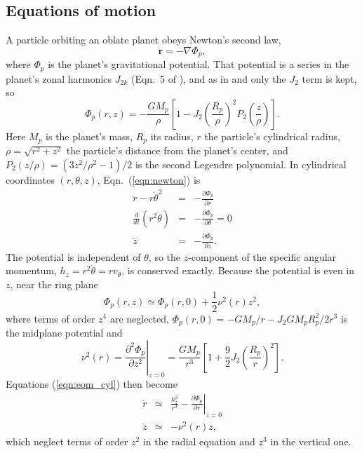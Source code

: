 \documentclass[twocolumn]{aastex702}
\begin{document}
\subsection{Equations of motion}
\label{sec:eom}

A particle orbiting an oblate planet obeys Newton's second law,
\begin{equation}
    \label{eqn:newton}
    \ddot{\mathbf{r}} = -\nabla\Phi_p,
\end{equation}
where $\Phi_p$ is the planet's gravitational potential. That potential is a series in the
planet's zonal harmonics $J_{2k}$ (Eqn.\ 5 of \citealt{BL94}), and as in \cite{HS13} and
\cite{H25} only the $J_2$ term is kept, so
\begin{equation}
    \label{eqn:Phi3d}
    \Phi_p(r,z) = -\frac{GM_p}{\rho}\left[1 - J_2\left(\frac{R_p}{\rho}\right)^2P_2\left(\frac{z}{\rho}\right)\right].
\end{equation}
Here $M_p$ is the planet's mass, $R_p$ its radius, $r$ the particle's cylindrical radius,
$\rho = \sqrt{r^2 + z^2}$ the particle's distance from the planet's center, and
$P_2(z/\rho) = (3z^2/\rho^2 - 1)/2$ is the second Legendre polynomial. In cylindrical coordinates
$(r, \theta, z)$, Eqn.\ (\ref{eqn:newton}) is
\begin{subequations}
\label{eqn:eom_cyl}
\begin{eqnarray}
    \ddot{r} - r\dot{\theta}^2 &=& -\frac{\partial\Phi_p}{\partial r} \label{eqn:eom_cyl_a}\\
    \frac{d}{dt}\left(r^2\dot{\theta}\right) &=& -\frac{\partial\Phi_p}{\partial\theta} = 0 \label{eqn:eom_cyl_b}\\
    \ddot{z} &=& -\frac{\partial\Phi_p}{\partial z}. \label{eqn:eom_cyl_c}
\end{eqnarray}
\end{subequations}
The potential is independent of $\theta$, so the $z$-component of the specific angular
momentum, $h_z = r^2\dot{\theta} = rv_\theta$, is conserved exactly.
Because the potential is even in $z$, near the ring plane
\begin{equation}
    \label{eqn:Phi_expand}
    \Phi_p(r,z) \simeq \Phi_p(r,0) + \frac{1}{2}\nu^2(r)z^2,
\end{equation}
where terms of order $z^4$ are neglected, $\Phi_p(r,0) = -GM_p/r - J_2GM_pR_p^2/2r^3$ is the midplane potential and
\begin{equation}
    \label{eqn:nu_r}
    \nu^2(r) = \left.\frac{\partial^2\Phi_p}{\partial z^2}\right|_{z=0}
        = \frac{GM_p}{r^3}\left[1 + \frac{9}{2}J_2\left(\frac{R_p}{r}\right)^2\right].
\end{equation}
Equations (\ref{eqn:eom_cyl}) then become
\begin{subequations}
\label{eqn:eom_expand}
\begin{eqnarray}
    \ddot{r} &\simeq& \frac{h_z^2}{r^3} - \left.\frac{\partial\Phi_p}{\partial r}\right|_{z=0} \label{eqn:eom_r}\\
    \ddot{z} &\simeq& -\nu^2(r)z, \label{eqn:eom_z}
\end{eqnarray}
\end{subequations}
which neglect terms of order $z^2$ in the radial equation and $z^3$ in the vertical one.
\end{document}
